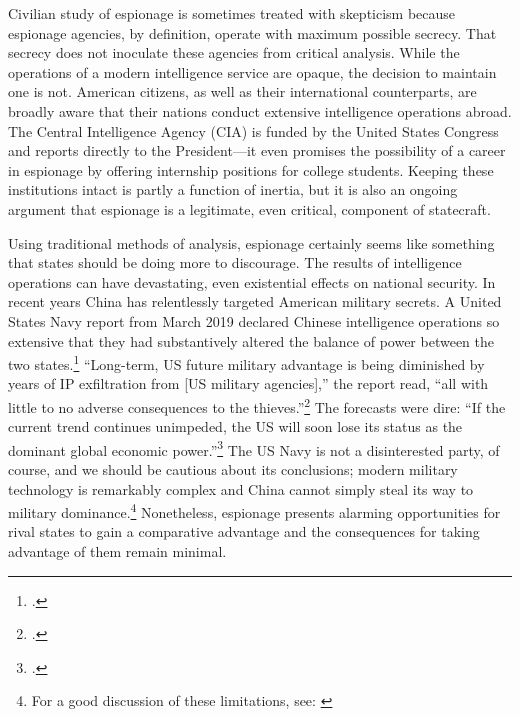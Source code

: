 \documentclass[14pt]{extarticle}
\begin{document}
Civilian study of espionage is sometimes treated with skepticism because espionage agencies, by definition, operate with maximum possible secrecy. That secrecy does not inoculate these agencies from critical analysis. While the operations of a modern intelligence service are opaque, the decision to maintain one is not. American citizens, as well as their international counterparts, are broadly aware that their nations conduct extensive intelligence operations abroad. The Central Intelligence Agency (CIA) is funded by the United States Congress and reports directly to the President---it even promises the possibility of a career in espionage by offering internship positions for college students. Keeping these institutions intact is partly a function of inertia, but it is also an ongoing argument that espionage is a legitimate, even critical, component of statecraft.

Using traditional methods of analysis, espionage certainly seems like something that states should be doing more to discourage. The results of intelligence operations can have devastating, even existential effects on national security. In recent years China has relentlessly targeted American military secrets. A United States Navy report from March 2019 declared Chinese intelligence operations so extensive that they had substantively altered the balance of power between the two states.\footcite{lubold_navy_2019} \enquote{Long-term, US future military advantage is being diminished by years of IP exfiltration from [US military agencies],} the report read, \enquote{all with little to no adverse consequences to the thieves.}\footcite[p.~6]{bayer_cybersecurity_2019} The forecasts were dire: \enquote{If the current trend continues unimpeded, the US will soon lose its status as the dominant global economic power.}\footcite[p.~5]{bayer_cybersecurity_2019} The US Navy is not a disinterested party, of course, and we should be cautious about its conclusions; modern military technology is remarkably complex and China cannot simply steal its way to military dominance.\footnote{For a good discussion of these limitations, see: \cite{gilli_why_2019}} Nonetheless, espionage presents alarming opportunities for rival states to gain a comparative advantage and the consequences for taking advantage of them remain minimal.

\end{document}
